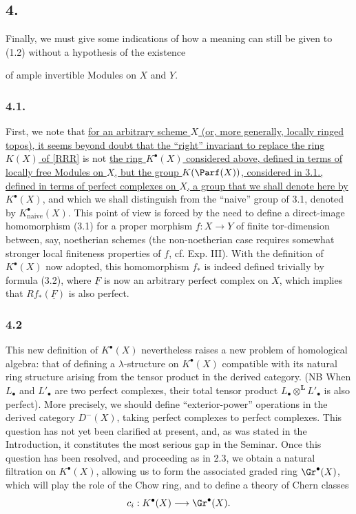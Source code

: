 \subsection*{4.}
Finally, we must give some indications of how a meaning can still be given to (1.2) without a hypothesis of the existence

of ample invertible Modules on $X$ and $Y$.

\subsubsection*{4.1.}
First, we note that \uline{for an arbitrary scheme $X$ (or, more generally, locally ringed topos), it seems beyond doubt that the ``right'' invariant to replace the ring $K(X)$ of [RRR]} is not \uline{the ring $K^\bullet(X)$ considered above, defined in terms of locally free Modules on $X$, but the group $K(\Parf(X))$, considered in 3.1., defined in terms of perfect complexes on $X$, a group that we shall denote here by} $K^\bullet(X)$, and which we shall distinguish from the ``naive'' group of 3.1, denoted by $K^\bullet_{\mathrm{naive}}(X)$. This point of view is forced by the need to define a direct-image homomorphism (3.1) for a proper morphism $f:X\to Y$ of finite tor-dimension between, say, noetherian schemes (the non-noetherian case requires somewhat stronger local finiteness properties of $f$, cf. Exp. III). With the definition of $K^\bullet(X)$ now adopted, this homomorphism $f_*$ is indeed defined trivially by formula (3.2), where $\underline F$ is now an arbitrary perfect complex on $X$, which implies that $Rf_*(\underline F)$ is also perfect.

\subsubsection*{4.2}
This new definition of $K^\bullet(X)$ nevertheless raises a new problem of homological algebra: that of defining a $\lambda$-structure on $K^\bullet(X)$ compatible with its natural ring structure arising from the tensor product in the derived category. (NB When $L_\bullet$ and $L'_\bullet$ are two perfect complexes, their total tensor product $L_\bullet\otimes^{\mathbf L}L'_\bullet$ is also perfect). More precisely, we should define ``exterior-power'' operations in the derived category $D^-(X)$, taking perfect complexes to perfect complexes. This question has not yet been clarified at present, and, as was stated in the Introduction, it constitutes the most serious gap in the Seminar. Once this question has been resolved, and proceeding as in 2.3, we obtain a natural filtration on $K^\bullet(X)$, allowing us to form the associated graded ring $\Gr^\bullet(X)$, which will play the role of the Chow ring, and to define a theory of Chern classes
\[
c_i:K^\bullet(X)\longrightarrow \Gr^\bullet(X).
\]

